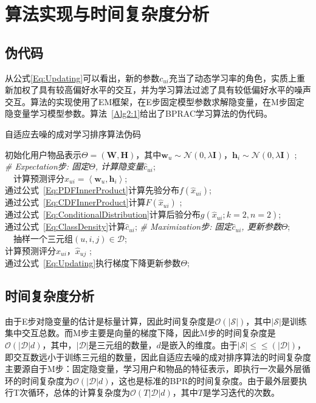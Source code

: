 \section{算法实现与时间复杂度分析}
\subsection{伪代码}
从公式\eqref{Eq:Updating}可以看出，新的参数$c_{ui}$充当了动态学习率的角色，实质上重新加权了具有较高偏好水平的交互，并为学习算法过滤了具有较低偏好水平的噪声交互。算法的实现使用了EM框架，在E步固定模型参数求解隐变量，在M步固定隐变量学习模型参数。算法~\ref{Alg2:1}给出了BPRAC学习算法的伪代码。
\begin{algorithm}[t]
	\caption{自适应去噪的成对学习排序算法伪码}\label{Alg2:1}
	初始化用户物品表示$\Theta =(\mathbf{W}, \mathbf{H})$，其中$\mathbf{w}_u \sim \mathcal{N}(0, \lambda \mathbf{I})$，$\mathbf{h}_i \sim \mathcal{N}(0, \lambda \mathbf{I})$ ;\\
	{
		\textit{\# Expectation步: 固定$\Theta$, 计算隐变量${{\hat c}_{ui}}$};\\
		{
			~~计算预测评分${{\hat x}_{ui}} = \left\langle   {{\mathbf{w}_u},{\mathbf{h}_i}} \right\rangle  $;\\
			通过公式~\eqref{Eq:PDFInnerProduct}计算先验分布$f({{\hat x}_{ui}})$;\\
			通过公式~\eqref{Eq:CDFInnerProduct}计算$F({{\hat x}_{ui}})$ ;\\
			通过公式~\eqref{Eq:ConditionalDistribution}计算后验分布$g({{\hat x}_{ui}};k=2,n=2)$;\\
			通过公式~\eqref{Eq:ClassDensity}计算${{\hat c}_{ui}}$;
		}
		\textit{\# Maximization步: 固定${{\hat c}_{ui}}$, 更新参数$\Theta$};\\
		{
			~~抽样一个三元组$(u,i,j) \in \mathcal{D}$;\\
			计算预测评分${{\hat x}_{ui}}$，${{\hat x}_{uj}}$ ;\\
			通过公式~\eqref{Eq:Updating}执行梯度下降更新参数$\Theta$;
		}
	}
\end{algorithm}

\subsection{时间复杂度分析}
由于E步对隐变量的估计是标量计算，因此时间复杂度是$\mathcal{O}(|\mathcal{S}|)$，其中$|\mathcal{S}|$是训练集中交互总数。而M步主要是向量的梯度下降，因此M步的时间复杂度是$\mathcal{O}(|\mathcal{D}|d)$，其中，$|\mathcal{D}|$是三元组的数量，$d$是嵌入的维度。由于$|\mathcal{S}| \le\le (|\mathcal{D}|)$，即交互数远小于训练三元组的数量，因此自适应去噪的成对排序算法的时间复杂度主要源自于M步：固定隐变量，学习用户和物品的特征表示，即执行一次最外层循环的时间复杂度为$\mathcal{O}(|\mathcal{D}|d)$，这也是标准的BPR的时间复杂度。由于最外层要执行T次循环，总体的计算复杂度为$\mathcal{O}(T|\mathcal{D}|d)$，其中$T$是学习迭代的次数。



